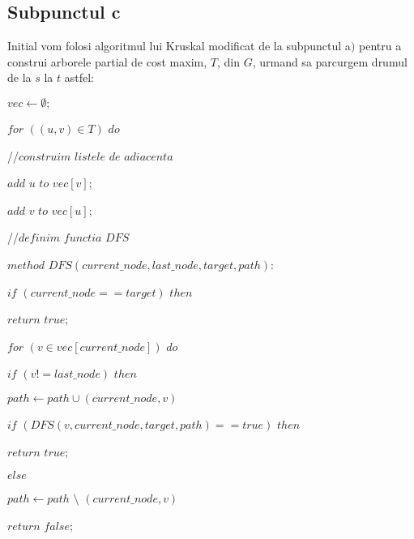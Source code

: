 \documentclass{article}
\begin{document}
\subsection*{\fontsize{16}{30}\selectfont Subpunctul c}
{\fontsize{14}{16}\selectfont Initial vom folosi algoritmul lui Kruskal modificat de la subpunctul a$)$ pentru a construi arborele partial de cost maxim, $T$, din $G$, urmand sa parcurgem drumul de la $s$ la $t$ astfel:
    \\
    \par $vec \leftarrow \emptyset;$ 
    \par $for$  $((u,v)\in T)$ $do$
    \par \hspace*{1cm} //$construim$  $listele$  $de$  $adiacenta$
    \par \hspace*{1cm} $add$  $u$  $to$  $vec[v];$
    \par \hspace*{1cm} $add$  $v$  $to$  $vec[u];$
    \\
    \par //$definim$  $functia$  $DFS$
    \par $method$ $DFS(current\_ node, last\_node, target, path):$
    \par \hspace*{1cm} $if$ $(current\_node == target)$ $then$
    \par \hspace*{1.5cm} $return$  $true;$
    \par \hspace*{1cm}$for$  $(v \in vec[current\_node])$  $do$
    \par \hspace*{1.5cm} $if$ $(v != last\_node)$  $then$
    \par \hspace*{2cm} $path \leftarrow path \cup (current\_node, v)$
    \par \hspace*{2cm} $if$  $(DFS(v, current\_node, target, path) == true)$ $then$
    \par \hspace*{2.5cm} $return$ $true;$ 
    \par \hspace*{2cm} $else$
    \par \hspace*{2.5cm} $path \leftarrow path$ $\setminus$ $(current\_node, v)$
    \par \hspace*{1cm} $return$ $false;$
}
\end{document}
